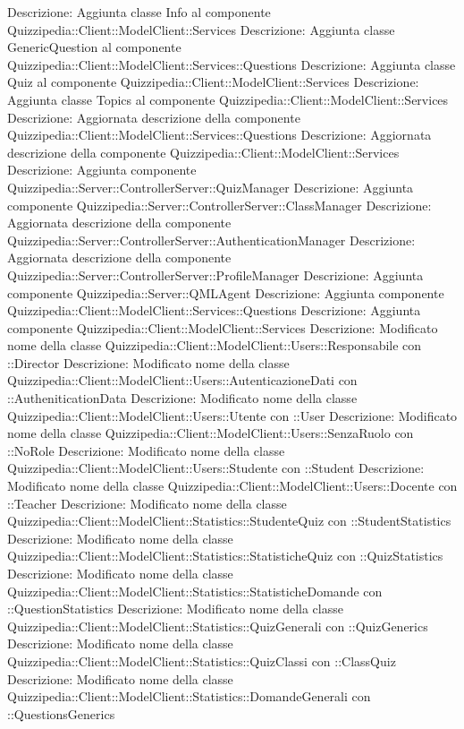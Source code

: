 Descrizione: Aggiunta classe Info al componente Quizzipedia::Client::ModelClient::Services 
Descrizione: Aggiunta classe GenericQuestion al componente Quizzipedia::Client::ModelClient::Services::Questions 
Descrizione: Aggiunta classe Quiz al componente Quizzipedia::Client::ModelClient::Services 
Descrizione: Aggiunta classe Topics al componente Quizzipedia::Client::ModelClient::Services 
Descrizione: Aggiornata descrizione della componente Quizzipedia::Client::ModelClient::Services::Questions 
Descrizione: Aggiornata descrizione della componente Quizzipedia::Client::ModelClient::Services 
Descrizione: Aggiunta componente Quizzipedia::Server::ControllerServer::QuizManager 
Descrizione: Aggiunta componente Quizzipedia::Server::ControllerServer::ClassManager 
Descrizione: Aggiornata descrizione della componente Quizzipedia::Server::ControllerServer::AuthenticationManager 
Descrizione: Aggiornata descrizione della componente Quizzipedia::Server::ControllerServer::ProfileManager 
Descrizione: Aggiunta componente Quizzipedia::Server::QMLAgent 
Descrizione: Aggiunta componente Quizzipedia::Client::ModelClient::Services::Questions 
Descrizione: Aggiunta componente Quizzipedia::Client::ModelClient::Services 
Descrizione: Modificato nome della classe Quizzipedia::Client::ModelClient::Users::Responsabile con ::Director 
Descrizione: Modificato nome della classe Quizzipedia::Client::ModelClient::Users::AutenticazioneDati con ::AutheniticationData 
Descrizione: Modificato nome della classe Quizzipedia::Client::ModelClient::Users::Utente con ::User 
Descrizione: Modificato nome della classe Quizzipedia::Client::ModelClient::Users::SenzaRuolo con ::NoRole 
Descrizione: Modificato nome della classe Quizzipedia::Client::ModelClient::Users::Studente con ::Student 
Descrizione: Modificato nome della classe Quizzipedia::Client::ModelClient::Users::Docente con ::Teacher 
Descrizione: Modificato nome della classe Quizzipedia::Client::ModelClient::Statistics::StudenteQuiz con ::StudentStatistics 
Descrizione: Modificato nome della classe Quizzipedia::Client::ModelClient::Statistics::StatisticheQuiz con ::QuizStatistics 
Descrizione: Modificato nome della classe Quizzipedia::Client::ModelClient::Statistics::StatisticheDomande con ::QuestionStatistics 
Descrizione: Modificato nome della classe Quizzipedia::Client::ModelClient::Statistics::QuizGenerali con ::QuizGenerics 
Descrizione: Modificato nome della classe Quizzipedia::Client::ModelClient::Statistics::QuizClassi con ::ClassQuiz 
Descrizione: Modificato nome della classe Quizzipedia::Client::ModelClient::Statistics::DomandeGenerali con ::QuestionsGenerics 

